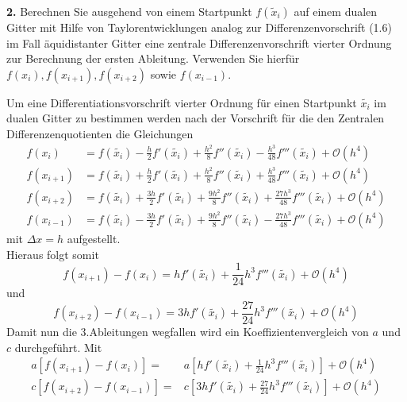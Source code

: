 \documentclass[Protokollheft.tex]{subfiles}
\begin{document}
	
	\begin{framed}
		\noindent \textbf{2.} Berechnen Sie ausgehend von einem Startpunkt \(f(\tilde{x}_i)\) auf einem dualen Gitter mit Hilfe von Taylorentwicklungen analog zur Differenzenvorschrift (1.6) im Fall äquidistanter Gitter eine zentrale Differenzenvorschrift vierter Ordnung zur Berechnung der ersten Ableitung. Verwenden Sie hierfür \(f(x_i), f(x_{i+1}), f(x_{i+2})\) sowie \(f(x_{i-1})\).\label{exer:diffquotOrd4}
	\end{framed}
	\noindent
	Um eine Differentiationsvorschrift vierter Ordnung für einen Startpunkt $\tilde{x_i}$ im dualen Gitter zu bestimmen werden nach der Vorschrift für die den Zentralen Differenzenquotienten die Gleichungen
	\begin{align}
		\label{eq:dgl}
		f({x_i}) & = f(\tilde{x_i}) - \frac{h}{2}f'(\tilde{x_i})+\frac{h^2}{8}f''(\tilde{x_i})-\frac{h^3}{48}f'''(\tilde{x_i}) + \mathcal{O}(h^4) \nonumber\\
		f({x_{i+1}}) & = f(\tilde{x_i}) + \frac{h}{2}f'(\tilde{x_i})+\frac{h^2}{8}f''(\tilde{x_i})+\frac{	h^3}{48}f'''(\tilde{x_i}) + \mathcal{O}(h^4)\\
		f({x_{i+2}}) & = f(\tilde{x_i}) + \frac{3h}{2}f'(\tilde{x_i})+\frac{9h^2}{8}f''(\tilde{x_i})+\frac{27h^3}{48}f'''(\tilde{x_i}) + \mathcal{O}(h^4) \nonumber\\
		f({x_{i-1}}) & = f(\tilde{x_i}) - \frac{3h}{2}f'(\tilde{x_i})+\frac{9h^2}{8}f''(\tilde{x_i})-\frac{27h^3}{48}f'''(\tilde{x_i}) + \mathcal{O}(h^4) \nonumber
	\end{align}
	mit $\Delta x = h$ aufgestellt. \\
	Hieraus folgt somit
	\begin{equation}
	\label{eq:LGS}
	f(x_{i+1}) - f(x_i) = hf'(\tilde{x_i}) + \frac{1}{24}h^3 f'''(\tilde{x_i})+\mathcal{O}(h^4) 
	\end{equation}
	und
	\begin{equation}
	\label{eq:LGS2}
	f(x_{i+2}) - f(x_{i-1})=3hf'(\tilde{x_i}) + \frac{27}{24}h^3f'''(\tilde{x_i}) + \mathcal{O}(h^4)
	\end{equation}
	\noindent
	Damit nun die 3.Ableitungen wegfallen wird ein Koeffizientenvergleich von $a$ und $c$ durchgeführt.
	Mit 
	\begin{align*}
		a[f(x_{i+1})-f(x_i)] =& a[hf'(\tilde{x_i}) + \frac{1}{24}h^3 f'''(\tilde{x_i})]+\mathcal{O}(h^4) \\
		c[f(x_{i+2})-f(x_{i-1})] =& c[3hf'(\tilde{x_i}) + \frac{27}{24}h^3f'''(\tilde{x_i}) ]+ \mathcal{O}(h^4)
	\end{align*}
\end{document}
